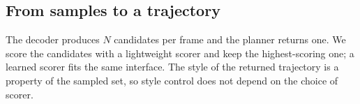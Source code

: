 \subsection{From samples to a trajectory}
\label{sec:method:select}
The decoder produces $N$ candidates per frame and the planner returns one. We score
the candidates with a lightweight scorer and keep the highest-scoring one; a learned
scorer fits the same interface. The style of the returned trajectory is a property
of the sampled set, so style control does not depend on the choice of scorer.
